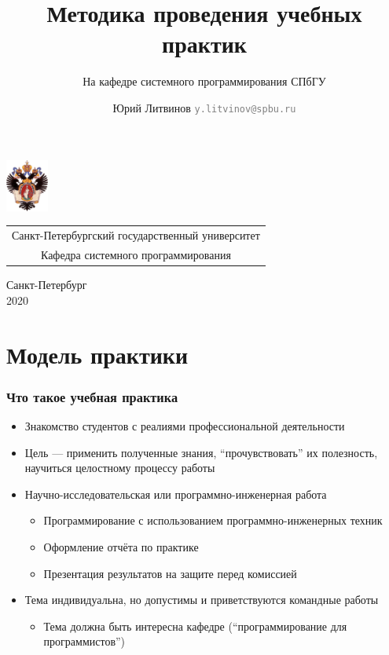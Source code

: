 \documentclass[xetex,mathserif,serif]{beamer}
\title{Методика проведения учебных практик}
\subtitle{На кафедре системного программирования СПбГУ}
\author[Юрий Литвинов]{Юрий Литвинов \newline \textcolor{gray}{\small\texttt{y.litvinov@spbu.ru}}}
\date{}
\begin{document}
{
\begin{frame}
  \includegraphics[width=1.4cm]{pictures/SPbGU_Logo.png}
\vspace{-35pt}
\hspace{-10pt}
\begin{center}
   \begin{tabular}{c}
        \scriptsize{Санкт-Петербургский государственный университет} \\
        \scriptsize{Кафедра системного программирования}
    \end{tabular}
\titlepage
\end{center}

\btVFill

\begin{center}
  \vspace{5pt}
  \scriptsize{Санкт-Петербург\\
                 2020}
  \end{center}

\end{frame}
}

    \section{Модель практики}

    \begin{frame}
        \frametitle{Что такое учебная практика}
        \begin{itemize}
            \item Знакомство студентов с реалиями профессиональной деятельности
            \item Цель --- применить полученные знания, ``прочувствовать'' их полезность, научиться целостному процессу работы
            \item Научно-исследовательская или программно-инженерная работа%
            \begin{itemize}
                \item Программирование с использованием программно-инженерных техник
                \item Оформление отчёта по практике
                \item Презентация результатов на защите перед комиссией
            \end{itemize}
            \item Тема индивидуальна, но допустимы и приветствуются командные работы
            \begin{itemize}
                \item Тема должна быть интересна кафедре (``программирование для программистов'')
            \end{itemize}
        \end{itemize}
    \end{frame}
\end{document}
